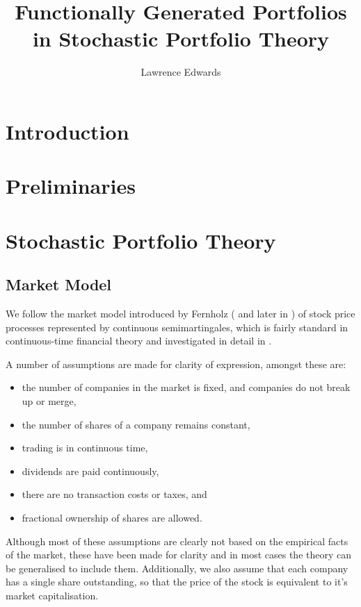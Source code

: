 \documentclass[british]{amsart}
\numberwithin{equation}{section}
\numberwithin{figure}{section}
\theoremstyle{plain}
\theoremstyle{definition}
\theoremstyle{plain}
\theoremstyle{plain}
\theoremstyle{plain}
\theoremstyle{remark}
\theoremstyle{plain}
\begin{document}
\title{Functionally Generated Portfolios in Stochastic Portfolio Theory}
\author{Lawrence Edwards}
\maketitle

\newpage

\tableofcontents{}

\newpage

\section{Introduction}

\newpage

\section{Preliminaries}

\newpage

\section{Stochastic Portfolio Theory}
\subsection{Market Model}

We follow the market model introduced by Fernholz (\cite{fernholz1999pgf} and later in \cite{fernholz2009}) of stock price processes represented by continuous semimartingales, which is fairly standard in continuous-time financial theory and investigated in detail in \cite{karatzas1998}.

A number of assumptions are made for clarity of expression, amongst these are:
\begin{itemize}
	\item the number of companies in the market is fixed, and companies do not break up or merge,
	\item the number of shares of a company remains constant,
	\item trading is in continuous time,
	\item dividends are paid continuously,
	\item there are no transaction costs or taxes, and
	\item fractional ownership of shares are allowed.
\end{itemize}

Although most of these assumptions are clearly not based on the empirical facts of the market, these have been made for clarity and in most cases the theory can be generalised to include them. Additionally, we also assume that each company has a single share outstanding, so that the price of the stock is equivalent to it's market capitalisation.
\end{document}
